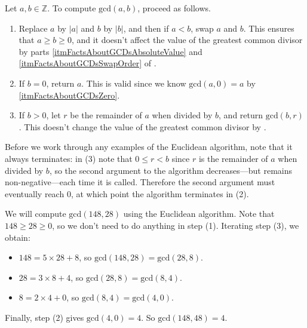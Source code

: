 \begin{strategy}
\label{strEuclideanAlgorithm}
Let $a,b \in \mathbb{Z}$. To compute $\mathrm{gcd}(a,b)$, proceed as follows.
\begin{enumerate}[(1)]
\item Replace $a$ by $|a|$ and $b$ by $|b|$, and then if $a<b$, swap $a$ and $b$. This ensures that $a \ge b \ge 0$, and it doesn't affect the value of the greatest common divisor by parts \ref{itmFactsAboutGCDsAbsoluteValue} and \ref{itmFactsAboutGCDsSwapOrder} of .
\item If $b = 0$, return $a$. This is valid since we know $\mathrm{gcd}(a,0) = a$ by \ref{itmFactsAboutGCDsZero}.
\item\label{itmEuclideanAlgorithmRecursiveStep} If $b > 0$, let $r$ be the remainder of $a$ when divided by $b$, and return $\mathrm{gcd}(b,r)$. This doesn't change the value of the greatest common divisor by .
\end{enumerate}
\end{strategy}

Before we work through any examples of the Euclidean algorithm, note that it always terminates: in (3) note that $0 \le r < b$ since $r$ is the remainder of $a$ when divided by $b$, so the second argument to the algorithm decreases---but remains non-negative---each time it is called. Therefore the second argument must eventually reach $0$, at which point the algorithm terminates in (2).

\begin{example}
We will compute $\mathrm{gcd}(148,28)$ using the Euclidean algorithm. Note that $148 \ge 28 \ge 0$, so we don't need to do anything in step (1). Iterating step (3), we obtain:
\begin{itemize}
\item $148 = 5 \times 28 + 8$, so $\mathrm{gcd}(148,28) = \mathrm{gcd}(28,8)$.
\item $28 = 3 \times 8 + 4$, so $\mathrm{gcd}(28,8) = \mathrm{gcd}(8,4)$.
\item $8 = 2 \times 4 + 0$, so $\mathrm{gcd}(8,4) = \mathrm{gcd}(4,0)$.
\end{itemize}
Finally, step (2) gives $\mathrm{gcd}(4,0) = 4$. So $\mathrm{gcd}(148,48) = 4$.
\end{example}

